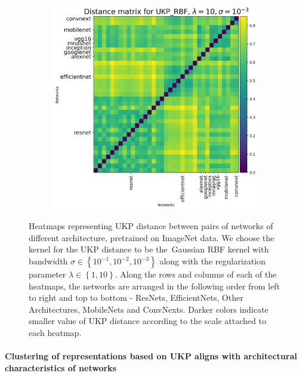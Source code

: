 \documentclass[11pt]{article}
\newcommand{\metricstname}{UKP }
\theoremstyle{plain}
\begin{document}
\begin{figure}[!h]
\begin{subfigure}[b]{0.3\textwidth}
    \end{subfigure}
    \hfill
    \begin{subfigure}[b]{0.3\textwidth}
        \includegraphics[width=\textwidth]{Appendix figures/imagenet_experiments/Heatmaps final/Heatmap for UKP_dist_RBF_1.000000e+01_1.000000e-03.png}
    \end{subfigure}
    
     \caption{Heatmaps representing \metricstname distance between pairs of networks of different architecture, pretrained on ImageNet data. We choose the kernel for the \metricstname distance to be the Gaussian RBF kernel with bandwidth $\sigma \in \left\{10^{-1},10^{-2},10^{-3}\right\}$ along with the regularization parameter $\lambda \in \left\{1,10\right\}$. Along the rows and columns of each of the heatmaps, the networks are arranged in the following order from left to right and top to bottom - ResNets, EfficientNets, Other Architectures, MobileNets and ConvNexts. Darker colors indicate smaller value of \metricstname distance according to the scale attached to each heatmap.}
    \label{ImageNet heatmaps}
\end{figure}

\paragraph{Clustering of representations based on UKP aligns with architectural characteristics of networks}
\end{document}
